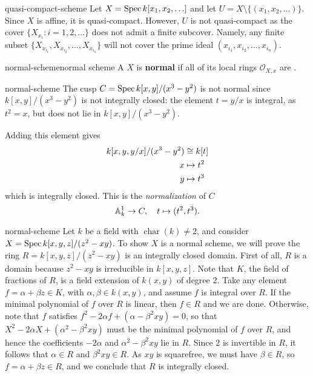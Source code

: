 \begin{example}{quasi-compact-scheme}
    Let $X = \Spec k[x_1, x_2, \ldots]$ and let $U = X \setminus \{ (x_1, x_2, \ldots) \}$. Since $X$ is affine, it is quasi-compact. However, $U$ is not quasi-compact as the cover $\{ X_{x_i} : i = 1, 2, \ldots \}$ does not admit a finite subcover. Namely, any finite subset $\{ X_{x_{i_1}}, X_{x_{i_2}}, \ldots, X_{x_{i_n}} \}$ will not cover the prime ideal $(x_{i_1}, x_{i_2}, \ldots, x_{i_n})$.
\end{example}

\begin{topic}{normal-scheme}{normal scheme}
    A  $X$ is \textbf{normal} if all of its local rings $\mathcal{O}_{X,x}$ are  .
\end{topic}

\begin{example}{normal-scheme}
    The cusp $C = \Spec k[x, y] / (x^3 - y^2)$ is not normal since $k[x, y] / (x^3 - y^2)$ is not integrally closed: the element $t = y/x$ is integral, as $t^2 = x$, but does not lie in $k[x, y] / (x^3 - y^2)$.
    
    Adding this element gives
    \[ \begin{aligned}
        k[x, y, y/x] / (x^3 - y^2) &\isom k[t] \\
        x &\mapsto t^2 \\
        y &\mapsto t^3
    \end{aligned} \]
    which is integrally closed. This is the \textit{normalization} of $C$
    \[ \AA_k^1 \to C, \quad t \mapsto (t^2, t^3) . \]
\end{example}

\begin{example}{normal-scheme}
    Let $k$ be a field with $\operatorname{char}(k) \ne 2$, and consider $X = \Spec k[x, y, z] / (z^2 - xy)$. To show $X$ is a normal scheme, we will prove the ring $R = k[x, y, z] / (z^2 - xy)$ is an integrally closed domain. First of all, $R$ is a domain because $z^2 - xy$ is irreducible in $k[x, y, z]$. Note that $K$, the field of fractions of $R$, is a field extension of $k(x, y)$ of degree $2$. Take any element $f = \alpha + \beta z \in K$, with $\alpha, \beta \in k(x, y)$, and assume $f$ is integral over $R$. If the minimal polynomial of $f$ over $R$ is linear, then $f \in R$ and we are done. Otherwise, note that $f$ satisfies $f^2 - 2 \alpha f + (\alpha - \beta^2 xy) = 0$, so that $X^2 - 2 \alpha X + (\alpha^2 - \beta^2 xy)$ must be the minimal polynomial of $f$ over $R$, and hence the coefficients $-2 \alpha$ and $\alpha^2 - \beta^2 xy$ lie in $R$. Since $2$ is invertible in $R$, it follows that $\alpha \in R$ and $\beta^2 xy \in R$. As $xy$ is squarefree, we must have $\beta \in R$, so $f = \alpha + \beta z \in R$, and we conclude that $R$ is integrally closed.
\end{example}

